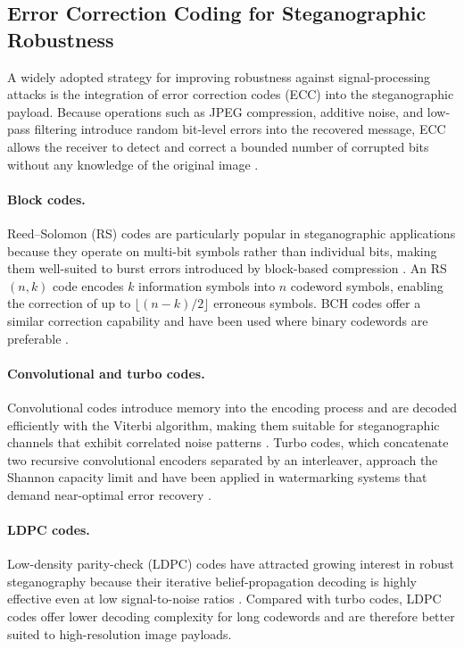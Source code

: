 \documentclass[12pt,a4paper,oneside]{report}
\begin{document}
	\subsection{Error Correction Coding for Steganographic Robustness}
	\label{subsec:ecc}
	
	A widely adopted strategy for improving robustness against signal-processing attacks is the
	integration of error correction codes (ECC) into the steganographic payload.
	Because operations such as JPEG compression, additive noise, and low-pass filtering introduce
	random bit-level errors into the recovered message, ECC allows the receiver to detect and correct
	a bounded number of corrupted bits without any knowledge of the original image \cite{cox2007digital}.
	
	\paragraph{Block codes.}
	Reed–Solomon (RS) codes are particularly popular in steganographic applications because they
	operate on multi-bit symbols rather than individual bits, making them well-suited to burst errors
	introduced by block-based compression \cite{marvel1999spread}.
	An RS$(n,k)$ code encodes $k$ information symbols into $n$ codeword symbols, enabling the
	correction of up to $\lfloor(n-k)/2\rfloor$ erroneous symbols.
	BCH codes offer a similar correction capability and have been used where binary codewords are
	preferable \cite{petitcolas1999information}.
	
	\paragraph{Convolutional and turbo codes.}
	Convolutional codes introduce memory into the encoding process and are decoded efficiently with
	the Viterbi algorithm, making them suitable for steganographic channels that exhibit correlated
	noise patterns \cite{proakis2008digital}.
	Turbo codes, which concatenate two recursive convolutional encoders separated by an interleaver,
	approach the Shannon capacity limit and have been applied in watermarking systems that demand
	near-optimal error recovery \cite{marvel1999spread}.
	
	\paragraph{LDPC codes.}
	Low-density parity-check (LDPC) codes have attracted growing interest in robust steganography
	because their iterative belief-propagation decoding is highly effective even at low signal-to-noise
	ratios \cite{johnson1998exploring}.
	Compared with turbo codes, LDPC codes offer lower decoding complexity for long codewords and
	are therefore better suited to high-resolution image payloads.
	
\end{document}
